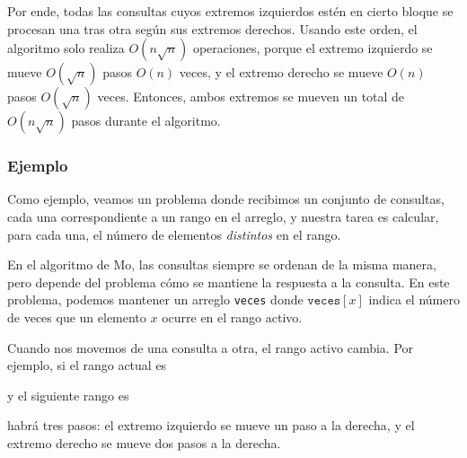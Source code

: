Por ende, todas las consultas cuyos extremos izquierdos estén en cierto
bloque se procesan una tras otra según sus extremos derechos. Usando este
orden, el algoritmo solo realiza $O(n \sqrt n)$ operaciones, porque el
extremo izquierdo se mueve $O(\sqrt n)$ pasos $O(n)$ veces, y el extremo
derecho se mueve $O(n)$ pasos $O(\sqrt n)$ veces. Entonces, ambos extremos
se mueven un total de $O(n \sqrt n)$ pasos durante el algoritmo.

\subsubsection*{Ejemplo}

Como ejemplo, veamos un problema donde recibimos un conjunto de consultas,
cada una correspondiente a un rango en el arreglo, y nuestra tarea es
calcular, para cada una, el número de elementos \emph{distintos} en el rango.

En el algoritmo de Mo, las consultas siempre se ordenan de la misma manera,
pero depende del problema cómo se mantiene la respuesta a la consulta.
En este problema, podemos mantener un arreglo \texttt{veces}
donde $\texttt{veces}[x]$ indica el número de veces que un elemento
$x$ ocurre en el rango activo.

Cuando nos movemos de una consulta a otra, el rango activo cambia. Por
ejemplo, si el rango actual es
\begin{center}
\end{center}
y el siguiente rango es
\begin{center}
\end{center}
habrá tres pasos: el extremo izquierdo se mueve un paso a la derecha, y el
extremo derecho se mueve dos pasos a la derecha.

